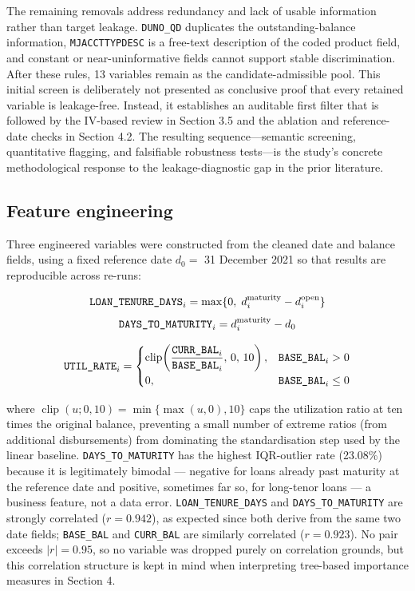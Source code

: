 \documentclass[11pt,a4paper]{article}
\begin{document}
The remaining removals address redundancy and lack of usable information rather than target leakage. \texttt{DUNO\_QD} duplicates the outstanding-balance information, \texttt{MJACCTTYPDESC} is a free-text description of the coded product field, and constant or near-uninformative fields cannot support stable discrimination. After these rules, 13 variables remain as the candidate-admissible pool. This initial screen is deliberately not presented as conclusive proof that every retained variable is leakage-free. Instead, it establishes an auditable first filter that is followed by the IV-based review in Section 3.5 and the ablation and reference-date checks in Section 4.2. The resulting sequence---semantic screening, quantitative flagging, and falsifiable robustness tests---is the study's concrete methodological response to the leakage-diagnostic gap in the prior literature.

\subsection{Feature engineering}

Three engineered variables were constructed from the cleaned date and balance fields, using a fixed reference date $d_0 = $ 31 December 2021 so that results are reproducible across re-runs:

\[
\text{\texttt{LOAN\_TENURE\_DAYS}}_i = \max\{0,\; d_i^{\mathrm{maturity}} - d_i^{\mathrm{open}}\}
\]
\[
\text{\texttt{DAYS\_TO\_MATURITY}}_i = d_i^{\mathrm{maturity}} - d_0
\]

\[
\text{\texttt{UTIL\_RATE}}_i =
\begin{cases}
\operatorname{clip}\!\left(\dfrac{\text{\texttt{CURR\_BAL}}_i}{\text{\texttt{BASE\_BAL}}_i},\,0,\,10\right), & \text{\texttt{BASE\_BAL}}_i>0 \\[6pt]
0, & \text{\texttt{BASE\_BAL}}_i \le 0
\end{cases}
\]

where $\operatorname{clip}(u;0,10)=\min\{\max(u,0),10\}$ caps the utilization ratio at ten times the original balance, preventing a small number of extreme ratios (from additional disbursements) from dominating the standardisation step used by the linear baseline. \texttt{DAYS\_TO\_MATURITY} has the highest IQR-outlier rate (23.08\%) because it is legitimately bimodal --- negative for loans already past maturity at the reference date and positive, sometimes far so, for long-tenor loans --- a business feature, not a data error. \texttt{LOAN\_TENURE\_DAYS} and \texttt{DAYS\_TO\_MATURITY} are strongly correlated ($r=0.942$), as expected since both derive from the same two date fields; \texttt{BASE\_BAL} and \texttt{CURR\_BAL} are similarly correlated ($r=0.923$). No pair exceeds $|r|=0.95$, so no variable was dropped purely on correlation grounds, but this correlation structure is kept in mind when interpreting tree-based importance measures in Section 4.
\end{document}
